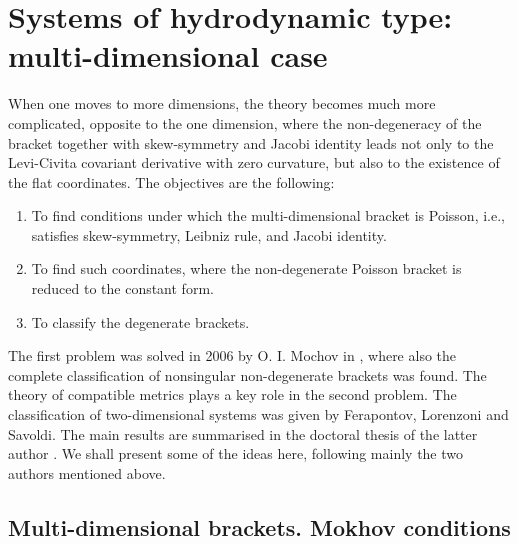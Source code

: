 \chapter{Systems of hydrodynamic type:  multi-dimensional case}

When one moves to more dimensions, the theory becomes much more complicated, opposite to the one dimension, where the non-degeneracy of the bracket together with skew-symmetry and Jacobi identity leads not only to the Levi-Civita covariant derivative with zero curvature, but also to the existence of the flat coordinates.
The objectives are the following:
\begin{enumerate}
    \item To find conditions under which the multi-dimensional bracket is Poisson, i.e., satisfies skew-symmetry, Leibniz rule, and Jacobi identity.
    \item To find such coordinates, where the non-degenerate Poisson bracket is reduced to the constant form.
    \item To classify the degenerate brackets.
\end{enumerate}

The first problem was solved in 2006 by O. I. Mochov in \cite{Mochov}, where also the complete classification of nonsingular non-degenerate brackets was found. The theory of compatible metrics plays a key role in the second problem.  The classification of two-dimensional systems was given by Ferapontov, Lorenzoni and Savoldi. The main results are summarised in the doctoral thesis of the latter author \cite{Savoldi}. We shall present some of the ideas here, following mainly the two authors mentioned above.

\section{Multi-dimensional brackets. Mokhov conditions}

